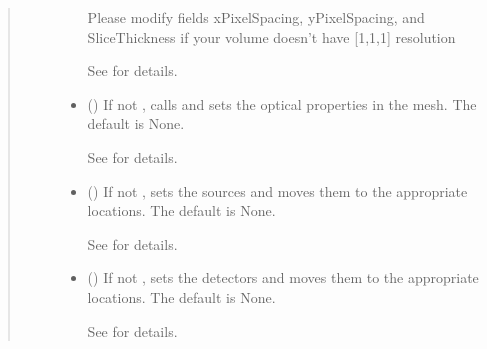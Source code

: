 \documentclass[letterpaper,10pt,english]{sphinxmanual}
\begin{document}
\begin{fulllineitems}
\begin{fulllineitems}
\begin{quote}
\begin{description}
\begin{itemize}
\sphinxAtStartPar
Please modify fields xPixelSpacing, yPixelSpacing, and SliceThickness if your volume doesn’t have {[}1,1,1{]} resolution

\sphinxAtStartPar
See {\hyperref[\detokenize{_autosummary/nirfasterff.utils.MeshingParams:nirfasterff.utils.MeshingParams}]{}} for details.


\item {} 
\sphinxAtStartPar
{} (\sphinxstyleliteralemphasis{\sphinxupquote{, }}) \textendash{} 
\sphinxAtStartPar
If not , calls  and sets the optical properties in the mesh. The default is None.

\sphinxAtStartPar
See {\hyperref[\detokenize{_autosummary/nirfasterff.base.stnd_mesh.stndmesh:nirfasterff.base.stnd_mesh.stndmesh.set_prop}]{}} for details.


\item {} 
\sphinxAtStartPar
{} (\sphinxstyleliteralemphasis{\sphinxupquote{, }}) \textendash{} 
\sphinxAtStartPar
If not , sets the sources and moves them to the appropriate locations. The default is None.

\sphinxAtStartPar
See {\hyperref[\detokenize{_autosummary/nirfasterff.base.optodes.optode:nirfasterff.base.optodes.optode.touch_sources}]{}} for details.


\item {} 
\sphinxAtStartPar
{} (\sphinxstyleliteralemphasis{\sphinxupquote{, }}) \textendash{} 
\sphinxAtStartPar
If not , sets the detectors and moves them to the appropriate locations. The default is None.

\sphinxAtStartPar
See {\hyperref[\detokenize{_autosummary/nirfasterff.base.optodes.optode:nirfasterff.base.optodes.optode.touch_detectors}]{}} for details.



\end{itemize}
\end{description}
\end{quote}
\end{fulllineitems}
\end{fulllineitems}
\end{document}
